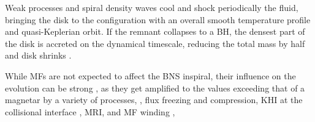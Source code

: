 Weak processes and spiral density waves cool and shock periodically the 
fluid, bringing the disk to the configuration with an overall smooth 
temperature profile 
and quasi-Keplerian orbit.
%
If the remnant collapses to a \ac{BH}, the densest part of the disk is 
accreted on the dynamical timescale, reducing the total mass by half 
and disk shrinks \citep{Perego:2019adq}.

While \acp{MF} are not expected to affect the \ac{BNS} inspiral, their influence 
on the \pmerg{} evolution can be strong \citep{Duez:2006qe,Kiuchi:2017zzg}, as they get amplified 
to the values exceeding that of a magnetar 
by a variety of processes, 
\eg, flux freezing and compression, \ac{KHI} at the collisional interface \citep{Kiuchi:2015sga},
\ac{MRI}, \citep{Duez:2006qe,Kiuchi:2017zzg} and \ac{MF} winding \citep{Duez:2006qe},

